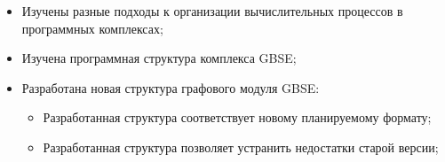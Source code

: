 ﻿%
\begin{frame}%

\begin{itemize}
	\item Изучены разные подходы к организации вычислительных процессов в программных комплексах;
	\item Изучена программная структура комплекса GBSE;
	\item Разработана новая структура графового модуля GBSE:
	\begin{itemize}
		\item Разработанная структура соответствует новому планируемому формату;
		\item Разработанная структура позволяет устранить недостатки старой версии;
	\end{itemize}
\end{itemize}

\end{frame}
